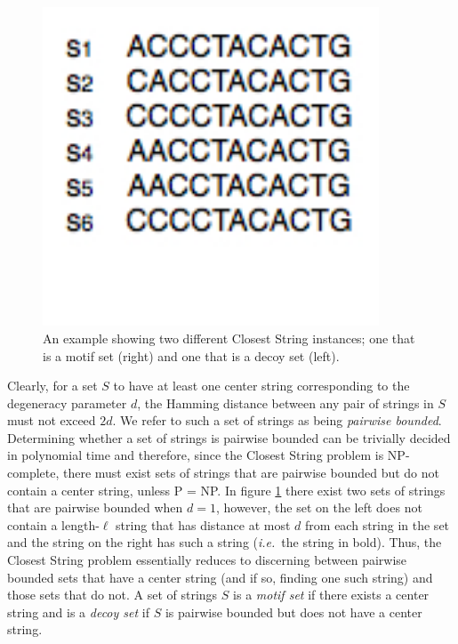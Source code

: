 \begin{figure}[htp]
  \begin{center}
  \includegraphics[width=100mm]{images/example1a}
  \end{center}
  \caption[An example showing two different {\sc Closest String} instances; one that is a motif set and one that is a decoy set.]{An example showing two different {\sc Closest String} instances; one that is a motif set (right) and one that is a decoy set (left).}
  \label{fig:motif_decoy_sets}
\end{figure}

Clearly, for a set $S$ to have at least one center string corresponding to the degeneracy parameter $d$, the Hamming distance between any pair of strings in $S$ must not exceed $2d$.  We refer to such a set of strings as being {\em pairwise bounded}. Determining whether a set of strings is pairwise bounded can be trivially decided in polynomial time and therefore, since the {\sc Closest String} problem is NP-complete, there must exist sets of strings that are pairwise bounded but do not contain a center string, unless P = NP.  In figure \ref{fig:motif_decoy_sets} there exist two sets of strings that are pairwise bounded when $d = 1$, however, the set on the left does not contain a length-$\ell$ string that has distance at most $d$ from each string in the set and the string on the right has such a string ({\em i.e.}\ the string in bold).  Thus, the {\sc Closest String} problem essentially reduces to discerning between pairwise bounded sets that have a center string (and if so, finding one such string) and those sets that do not. A set of strings $S$ is a {\em motif set} if there exists a center string and is a {\em decoy set} if $S$ is pairwise bounded but does not have a center string.


